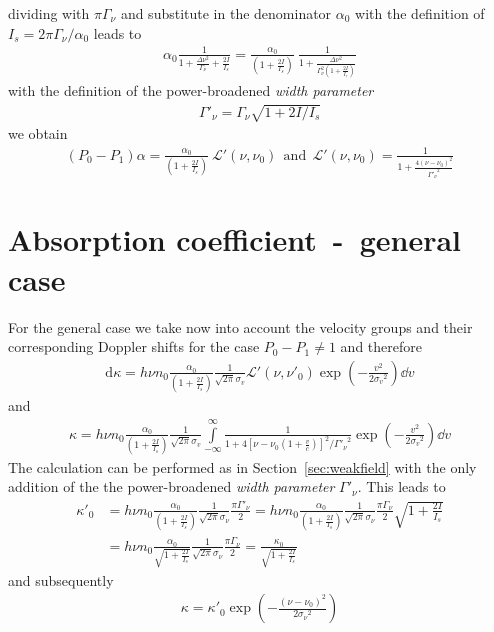 dividing with \(\pi\Gamma_\nu \) and substitute in the denominator \(\alpha_0 \) with the definition of \( I_s = 2\pi\Gamma_\nu / \alpha_0 \) leads to
\begin{align}
    \alpha_0 \frac{1}{1 + \frac{\Delta\nu^2}{\Gamma_\nu} + \frac{2I}{I_s} } = \frac{\alpha_0}{(1 + \frac{2I}{I_s})}~\frac{1}{1+ \frac{\Delta\nu^2}{\Gamma_\nu^2(1 + \frac{2I}{I_s})}}
\end{align}
with the definition of the power-broadened \textit{width parameter}
\begin{align}
    \Gamma'_\nu = \Gamma_\nu \sqrt{1 + 2I/I_s}
\end{align}
we obtain
\begin{align}
    (P_0-P_1)\alpha = \frac{\alpha_0}{(1 + \frac{2I}{I_s})}~\mathcal{L}'(\nu,\nu_0)~~\text{and}~~\mathcal{L}'(\nu,\nu_0)= \frac{1}{1+ \frac{{4(\nu-\nu_0)}^2}{{\Gamma'_\nu}^2}}
\end{align}
\pagebreak
\section{Absorption coefficient~-~general case}  %
For the general case we take now into account the velocity groups and their corresponding Doppler 
shifts for the case \(P_0-P_1 \neq 1 \) and therefore 
\begin{align}
    \mathrm{d}\kappa = h\nu n_0 \frac{\alpha_0}{(1 + \frac{2I}{I_s})} \frac{1}{\sqrt{2\pi}\sigma_v} \mathcal{L}'(\nu,\nu'_0) \exp{ \left( -\frac{v^2}{2 {\sigma_v}^2} \right ) } \dd v
\end{align}
and
\begin{align}
    \kappa = h\nu n_0 \frac{\alpha_0}{(1 + \frac{2I}{I_s})} \frac{1}{\sqrt{2\pi}\sigma_v} 
    \int\limits_{-\infty}^{\infty} \frac{1}{ 1+4 {\left [\nu-\nu_0\left ( 1 + \frac{v}{c} \right) \right] }^2 / {\Gamma'_\nu}^2 } 
    \exp{ \left (-\frac{v^2}{ 2{\sigma_v}^2 }\right ) } \dd v
\end{align}
The calculation can be performed as in Section~\ref{sec:weakfield} with the only addition of the
the power-broadened \textit{width parameter} \(\Gamma'_\nu \). This leads to
\begin{align}
    \kappa'_0 &= h\nu n_0 \frac{\alpha_0}{(1 + \frac{2I}{I_s})} \frac{1}{\sqrt{2\pi}\sigma_\nu} \frac{\pi \Gamma'_\nu}{2}
    = h\nu n_0 \frac{\alpha_0}{(1 + \frac{2I}{I_s})} \frac{1}{\sqrt{2\pi}\sigma_\nu} \frac{\pi \Gamma_\nu}{2} \sqrt{1+ \frac{2I}{I_s}} \nonumber \\
    &= h\nu n_0 \frac{\alpha_0}{\sqrt{1 + \frac{2I}{I_s}}} \frac{1}{\sqrt{2\pi}\sigma_\nu} \frac{\pi \Gamma_\nu}{2}
    = \frac{\kappa_0}{\sqrt{1 + \frac{2I}{I_s}}}
\end{align}
and subsequently
\begin{align}
    \kappa = \kappa'_0 \exp{ \left ( -\frac{{(\nu - \nu_0)}^2 }{2 {\sigma_\nu}^2 } \right )} \label{eq:kappa_general}
\end{align}

